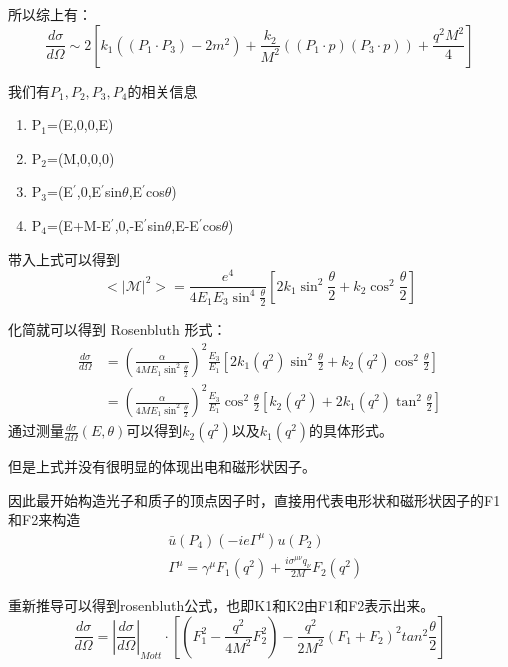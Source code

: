 \documentclass[slidestop, compress, red]{beamer}
\begin{document}
\begin{frame}

所以综上有：
\begin{equation}
\frac{d\sigma}{d\Omega}\sim 2[k_1((P_1\cdot P_3)-2m^2)+\frac{k_2}{M^2}((P_1\cdot p)(P_3\cdot p))+\frac{q^2M^2}{4}]
\end{equation}

我们有$P_1,P_2,P_3,P_4$的相关信息
\begin{enumerate}
\item P$_1$=(E,0,0,E)
\item P$_2$=(M,0,0,0)
\item P$_3$=(E$^{'}$,0,E$^{'}$sin$\theta$,E$^{'}$cos$\theta$)
\item P$_4$=(E+M-E$^{'}$,0,-E$^{'}$sin$\theta$,E-E$^{'}$cos$\theta$)
\end{enumerate}
带入上式可以得到
\begin{equation}
<|\mathcal M|^2>=\frac{e^4}{4E_1E_3\sin^4\frac{\theta}{2}}[2k_1\sin^2\frac{\theta}{2}+k_2\cos^2\frac{\theta}{2}]
\end{equation}
\end{frame}
\begin{frame}
化简就可以得到 Rosenbluth 形式：
\begin{equation}
\begin{aligned}
\frac{d\sigma}{d\Omega}&=(\frac{\alpha}{4ME_1\sin^2\frac{\theta}{2}})^2\frac{E_3}{E_1}[2k_1(q^2)\sin^2\frac{\theta}{2}+k_2(q^2)\cos^2\frac{\theta}{2}]\\
&=(\frac{\alpha}{4ME_1\sin^2\frac{\theta}{2}})^2\frac{E_3}{E_1}\cos^2\frac{\theta}{2}[k_2(q^2)+2k_1(q^2)\tan^2\frac{\theta}{2}]
\end{aligned}
\end{equation}
通过测量$\frac{d\sigma}{d\Omega}(E,\theta)$可以得到$k_2(q^2)$以及$k_1(q^2)$的具体形式。


但是上式并没有很明显的体现出电和磁形状因子。
\end{frame}
\begin{frame}

因此最开始构造光子和质子的顶点因子时，直接用代表电形状和磁形状因子的F1和F2来构造
\begin{equation}
\begin{split}
&\bar u(P_4)(-ie\Gamma^\mu)u(P_2)\\
&\Gamma^\mu=\gamma^\mu F_1(q^2)+\frac{i\sigma^{\mu\nu}q_\nu}{2M}F_2(q^2)
\end{split}
\end{equation}

重新推导可以得到rosenbluth公式，也即K1和K2由F1和F2表示出来。
\begin{equation}
\frac{d\sigma}{d\Omega}=|\frac{d\sigma}{d\Omega}|_{Mott}\cdot[(F_1^2-\frac{q^2}{4M^2}F_2^2)-\frac{q^2}{2M^2}(F_1+F_2)^2tan^2\frac{\theta}{2}]
\end{equation}
\end{frame}
\end{document}
